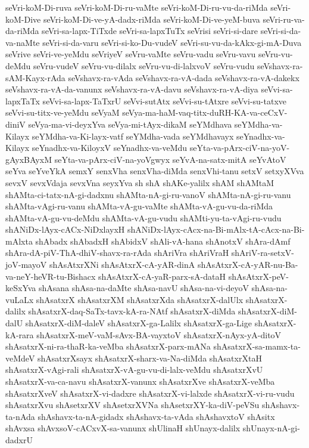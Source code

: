 {seVri-koM-Di-ruva
seVri-koM-Di-ru-vaMte
seVri-koM-Di-ru-vu-da-riMda
seVri-koM-Dive
seVri-koM-Di-ve-yA-dadx-riMda
seVri-koM-Di-ve-yeM-buva
seVri-ru-va-da-riMda
seVri-sa-lapx-TiTxde
seVri-sa-lapxTuTx
seVrisi
seVri-si-dare
seVri-si-da-va-naMte
seVri-si-da-varu
seVri-si-ko-Du-vudeV
seVri-su-vu-da-kAkx-gi-mA-Duva
seVrive
seVri-ve-yeMdu
seVriyeV
seVru-vaMte
seVru-vadu
seVru-vavu
seVru-vu-deMdu
seVru-vudeV
seVru-vu-dilalx
seVru-vu-di-lalxvoV
seVru-vudu
seVshavx-ra-sAM-Kayx-rAda
seVshavx-ra-vAda
seVshavx-ra-vA-dada
seVshavx-ra-vA-dakekx
seVshavx-ra-vA-da-vanunx
seVshavx-ra-vA-davu
seVshavx-ra-vA-diya
seVvi-sa-lapxTaTx
seVvi-sa-lapx-TaTxrU
seVvi-sutAtx
seVvi-su-tAtxre
seVvi-su-tatxve
seVvi-su-titx-ve-yeMdu
seVyaM
seVya-ma-haM-vaq-titx-duRH-KA-va-ceCxV-diniV
seVya-ma-vi-deyxYva
seVya-mi-tAyx-dikaM
seYMdhava
seYMdha-va-Kilayx
seYMdha-va-Ki-layx-vatf
seYMdha-vada
seYMdhavayx
seYnadhx-va-Kilayx
seYnadhx-va-KiloyxV
seYnadhx-va-veMdu
seYta-va-pArx-ciV-na-yoV-gAyxBAyxM
seYta-va-pArx-ciV-na-yoVgwyx
seYvA-na-satx-mitA
seYvAtoV
seYva
seYveYkA
semxY
senxVha
senxVha-diMda
senxVhi-tanu
setxV
setxyXVva
sevxV
sevxVdaja
sevxVna
seyxYva
sh
shA
shAKe-yalilx
shAM
shAMtaM
shAMta-ci-tatx-nA-gi-dadxnu
shAMta-nA-gi-ru-vanoV
shAMta-nA-gi-ru-vanu
shAMta-vAgi-ru-vanu
shAMta-vA-gu-vaMte
shAMta-vA-gu-vu-da-riMda
shAMta-vA-gu-vu-deMdu
shAMta-vA-gu-vudu
shAMti-yu-ta-vAgi-ru-vudu
shANiDx-lAyx-cACx-NiDxlayxH
shANiDx-lAyx-cAcx-na-Bi-mAlx-tA-cAcx-na-Bi-mAlxta
shAbadx
shAbadxH
shAbidxV
shAli-vA-hana
shAnotxV
shAra-dAmf
shAra-dA-piV-ThA-dhiV-shavx-ra-rAda
shAriVra
shAriVraH
shAriV-ra-setxV-joV-mayoV
shAsAtxrXNi
shAsAtxrX-cA-yAR-dinA
shAsAtxrX-cA-yAR-nu-Ba-va-neY-heVR-tu-Bishacx
shAsAtxrX-cA-yaR-parx-sA-dataH
shAsAtxrX-peV-keSxYva
shAsana
shAsa-na-daMte
shAsa-navU
shAsa-na-vi-deyoV
shAsa-na-vuLaLx
shAsatxrX
shAsatxrXM
shAsatxrXda
shAsatxrX-dalUlx
shAsatxrX-dalilx
shAsatxrX-daq-SaTx-tavx-kA-ra-NAtf
shAsatxrX-diMda
shAsatxrX-diM-dalU
shAsatxrX-diM-daleV
shAsatxrX-ga-Lalilx
shAsatxrX-ga-Lige
shAsatxrX-kA-rara
shAsatxrX-meV-vaM-sAvx-BA-vayxtoV
shAsatxrX-nAyx-yA-ditoV
shAsatxrX-ni-ra-thaR-ka-veMba
shAsatxrX-parx-mANa
shAsatxrX-sa-mamx-ta-veMdeV
shAsatxrXsayx
shAsatxrX-sharx-va-Na-diMda
shAsatxrXtaH
shAsatxrX-vAgi-rali
shAsatxrX-vA-gu-vu-di-lalx-veMdu
shAsatxrXvU
shAsatxrX-va-ca-navu
shAsatxrX-vanunx
shAsatxrXve
shAsatxrX-veMba
shAsatxrXveV
shAsatxrX-vi-dadxre
shAsatxrX-vi-lalxde
shAsatxrX-vi-ru-vudu
shAsatxrXvu
shAsetxrXV
shAsetxrXVNa
shAsetxrXY-ka-diV-peVSu
shAshavx-ta-nAda
shAshavx-ta-nA-gidadx
shAshavx-ta-vAda
shAshavxtoV
shAsitx
shAvxsa
shAvxsoV-cACxvX-sa-vanunx
shUlinaH
shUnayx-dalilx
shUnayx-nA-gi-dadxrU
}
